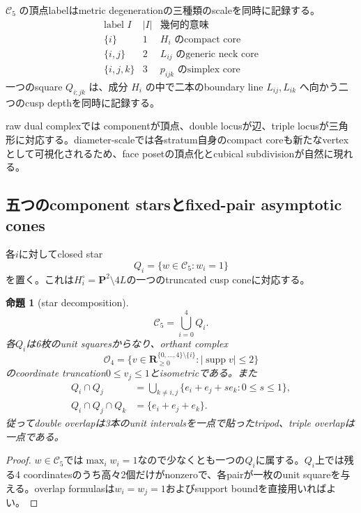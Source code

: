 \documentclass[11pt,a4paper]{ltjsarticle}
\newtheorem{proposition}[theorem]{命題}
\theoremstyle{definition}
\theoremstyle{remark}
\newcommand{\PP}{\mathbf P}
\newcommand{\RR}{\mathbf R}
\newcommand{\cC}{\mathcal C}
\newcommand{\supp}{\operatorname{supp}}
\begin{document}
$\cC_5$ の頂点labelはmetric degenerationの三種類のscaleを同時に記録する。
\[
 \begin{array}{c|c|c}
 \text{label }I&|I|&\text{幾何的意味}\\
 \hline
 \{i\}&1&H_i\text{ のcompact core}\\
 \{i,j\}&2&L_{ij}\text{ のgeneric neck core}\\
 \{i,j,k\}&3&p_{ijk}\text{ のsimplex core}
 \end{array}
\]
一つのsquare $Q_{i;jk}$ は、成分 $H_i$ の中で二本のboundary line $L_{ij},L_{ik}$ へ向かう二つのcusp depthを同時に記録する。

raw dual complexでは componentが頂点、double locusが辺、triple locusが三角形に対応する。diameter-scaleでは各stratum自身のcompact coreも新たなvertexとして可視化されるため、face posetの頂点化とcubical subdivisionが自然に現れる。

\subsection{五つのcomponent starsとfixed-pair asymptotic cones}

各$i$に対してclosed star
\begin{equation}\label{eq:Qi-star}
 Q_i=\{w\in\cC_5:w_i=1\}
\end{equation}
を置く。これは$H_i^\circ=\PP^2\setminus4L$の一つのtruncated cusp coneに対応する。

\begin{proposition}[star decomposition]\label{prop:star-decomposition}
\begin{equation}\label{eq:C5-union-stars}
 \cC_5=\bigcup_{i=0}^4Q_i.
\end{equation}
各$Q_i$は6枚のunit squaresからなり、orthant complex
\begin{equation}\label{eq:O4}
 \mathscr O_4=
 \{v\in\RR_{\ge0}^{\{0,\dots,4\}\setminus\{i\}}:
      |\supp v|\le2\}
\end{equation}
のcoordinate truncation$0\le v_j\le1$とisometricである。また
\begin{align}
 Q_i\cap Q_j
 &=\bigcup_{k\ne i,j}\{e_i+e_j+s e_k:0\le s\le1\},
 \label{eq:star-double-overlap}\\
 Q_i\cap Q_j\cap Q_k&=\{e_i+e_j+e_k\}.
 \label{eq:star-triple-overlap}
\end{align}
従ってdouble overlapは3本のunit intervalsを一点で貼ったtripod、triple overlapは一点である。
\end{proposition}

\begin{proof}
$w\in\cC_5$では$\max_iw_i=1$なので少なくとも一つの$Q_i$に属する。$Q_i$上では残る4 coordinatesのうち高々2個だけがnonzeroで、各pairが一枚のunit squareを与える。overlap formulasは$w_i=w_j=1$およびsupport boundを直接用いればよい。
\end{proof}
\end{document}

